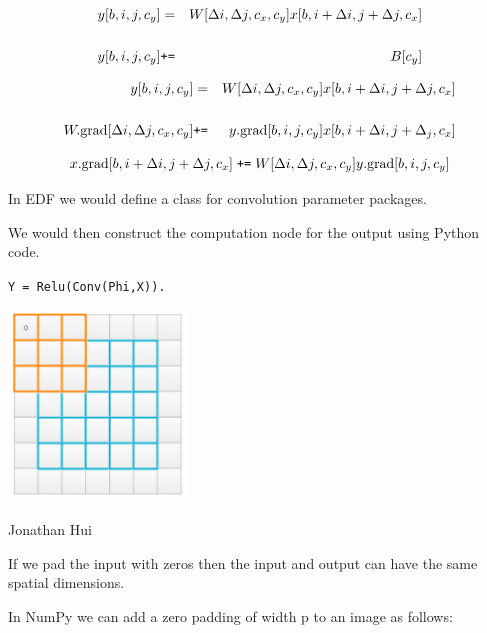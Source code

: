 {\begin{eqnarray*}
  y[b,i,j,c_y] & = &   W[\Delta i, \Delta j, c_x, c_y] x[b,i + \Delta i, j + \Delta j, c_x] \\
  \\
  y[b,i,j,c_y] & \mbox{\tt +=} & B[c_y]
\end{eqnarray*}


\begin{eqnarray*}
  y[b,i,j,c_y] & = &   W[\Delta i, \Delta j, c_x, c_y] x[b,i + \Delta i, j + \Delta j, c_x] \\
  \\
  W.\mathrm{grad}[\Delta i, \Delta j,c_x,c_y] & \mbox{\tt +=} & y.\mathrm{grad}[b,i,j,c_y]x[b,i + \Delta i,j+ \Delta_j,c_x]
\end{eqnarray*}

$$x.\mathrm{grad}[b,i+\Delta i,j+\Delta j,c_x] \;\mbox{\tt +=} \; W[\Delta i, \Delta j, c_x, c_y] y.\mathrm{grad}[b,i,j,c_y]$$


In EDF we would define a class for convolution parameter packages.

\vfill
We would then construct the computation node for the output using Python code.

\vfill
\centerline{\tt Y = Relu(Conv(Phi,X)).}


\centerline{\includegraphics[height = 2.0in]{../images/padding2}}
\centerline{\large Jonathan Hui}

\vfill
If we pad the input with zeros then the input and output can have the same spatial dimensions.


In NumPy we can add a zero padding of width p to an image as follows:

}
